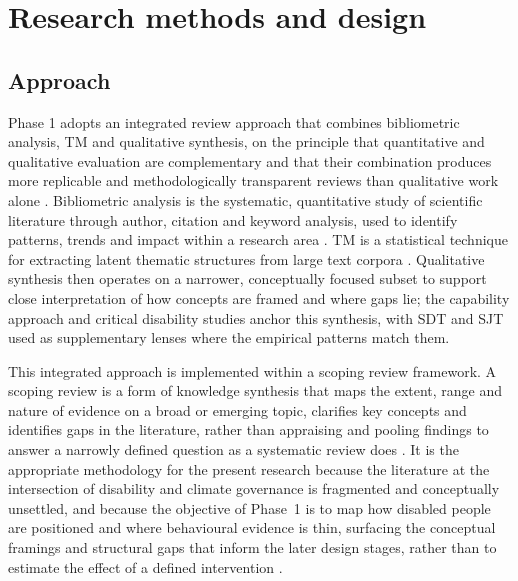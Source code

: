 \documentclass[12pt,a4paper]{report}
\begin{document}
\section{Research methods and design}
\subsection{Approach}

Phase 1 adopts an integrated review approach that combines bibliometric analysis, TM and qualitative synthesis, on the principle that quantitative and qualitative evaluation are complementary and that their combination produces more replicable and methodologically transparent reviews than qualitative work alone \cite{shen_lai_2022_souvenirs,hicks_2015_leiden_manifesto}. Bibliometric analysis is the systematic, quantitative study of scientific literature through author, citation and keyword analysis, used to identify patterns, trends and impact within a research area \cite{passas2024bibliometric,ragazou2022investigating}. TM is a statistical technique for extracting latent thematic structures from large text corpora \cite{blei2012probabilistic,barde2017overview,ogunleye_2025_topic}. Qualitative synthesis then operates on a narrower, conceptually focused subset to support close interpretation of how concepts are framed and where gaps lie; the capability approach and critical disability studies anchor this synthesis, with SDT and SJT used as supplementary lenses where the empirical patterns match them.

This integrated approach is implemented within a scoping review framework. A scoping review is a form of knowledge synthesis that maps the extent, range and nature of evidence on a broad or emerging topic, clarifies key concepts and identifies gaps in the literature, rather than appraising and pooling findings to answer a narrowly defined question as a systematic review does \cite{arksey2005scoping,levac2010scoping,munn2018systematic}. It is the appropriate methodology for the present research because the literature at the intersection of disability and climate governance is fragmented and conceptually unsettled, and because the objective of Phase~1 is to map how disabled people are positioned and where behavioural evidence is thin, surfacing the conceptual framings and structural gaps that inform the later design stages, rather than to estimate the effect of a defined intervention \cite{munn2018systematic}.
\end{document}
